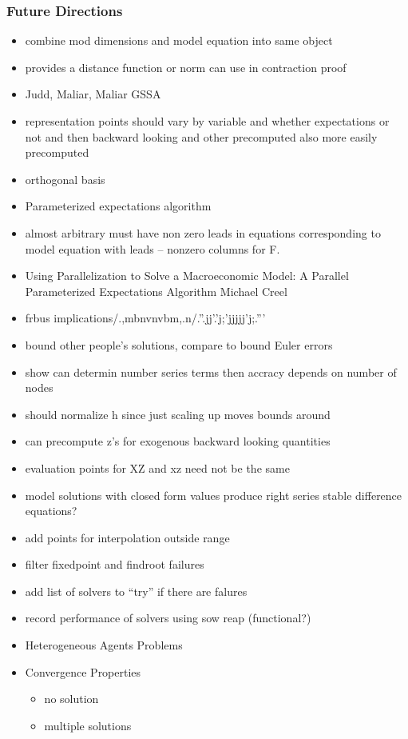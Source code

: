 \documentclass[tikz]{beamer}
\begin{document}
\begin{frame}
  \frametitle{Future Directions}
  \begin{itemize}
  \item combine mod dimensions and model equation into same object
  \item provides a distance function or norm can use in contraction proof
  \item Judd, Maliar, Maliar GSSA
  \item representation points should vary by variable and whether expectations or not and then backward looking and other precomputed also more easily precomputed
  \item orthogonal basis
  \item Parameterized expectations algorithm
  \item almost arbitrary must have non zero leads in equations corresponding to model equation with leads -- nonzero columns for F.
  \item Using Parallelization to Solve a Macroeconomic Model: A Parallel Parameterized Expectations Algorithm
Michael Creel
  \item frbus implications/.,mbnvnvbm,.n/.''.jj'.'j;'jjjjj'j;.'''
  \item bound other people's solutions, compare to bound Euler errors
  \item show can determin number series terms then accracy depends on number of nodes
  \item should normalize h since just scaling up moves bounds around
  \item can precompute z's for exogenous backward looking quantities
  \item evaluation points for XZ and xz need not be the same
  \item model solutions with closed form values produce right series stable difference equations?
  \item add points for interpolation outside range
  \item filter fixedpoint and findroot failures
  \item add list of solvers to ``try'' if there are falures
  \item record performance of solvers using sow reap (functional?)
  \item Heterogeneous Agents Problems
  \item Convergence Properties
    \begin{itemize}
    \item no solution
    \item multiple solutions

\end{itemize}
\end{itemize}
\end{frame}
\end{document}
